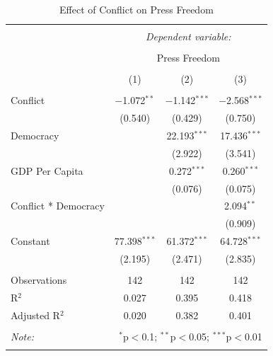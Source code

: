\documentclass[12pt]{article}
\begin{document}
\begin{enumerate}
\begin{table}[!htbp] \centering 
  \caption{Effect of Conflict on Press Freedom} 
  \label{} 
\begin{tabular}{@{\extracolsep{5pt}}lccc} 
\\[-1.8ex]\hline 
\hline \\[-1.8ex] 
 & \multicolumn{3}{c}{\textit{Dependent variable:}} \\ 
\cline{2-4} 
\\[-1.8ex] & \multicolumn{3}{c}{Press Freedom} \\ 
\\[-1.8ex] & (1) & (2) & (3)\\ 
\hline \\[-1.8ex] 
 Conflict & $-$1.072$^{**}$ & $-$1.142$^{***}$ & $-$2.568$^{***}$ \\ 
  & (0.540) & (0.429) & (0.750) \\ 
  Democracy &  & 22.193$^{***}$ & 17.436$^{***}$ \\ 
  &  & (2.922) & (3.541) \\ 
  GDP Per Capita &  & 0.272$^{***}$ & 0.260$^{***}$ \\ 
  &  & (0.076) & (0.075) \\ 
  Conflict * Democracy &  &  & 2.094$^{**}$ \\ 
  &  &  & (0.909) \\ 
  Constant & 77.398$^{***}$ & 61.372$^{***}$ & 64.728$^{***}$ \\ 
  & (2.195) & (2.471) & (2.835) \\ 
 \hline \\[-1.8ex] 
Observations & 142 & 142 & 142 \\ 
R$^{2}$ & 0.027 & 0.395 & 0.418 \\ 
Adjusted R$^{2}$ & 0.020 & 0.382 & 0.401 \\ 
\hline 
\hline \\[-1.8ex] 
\textit{Note:}  & \multicolumn{3}{r}{$^{*}$p$<$0.1; $^{**}$p$<$0.05; $^{***}$p$<$0.01} \\ 
\normalsize 
\end{tabular} 
\end{table} 

\end{enumerate}
\end{document}
